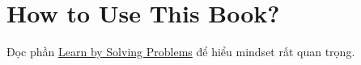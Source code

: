 \documentclass[a4paper]{report}
\begin{document}
\maketitle
\tableofcontents

\chapter{How to Use This Book?}

Đọc phần \href{https://artofproblemsolving.com/ebooks/prealgebra-ebook/par/154183}{Learn by Solving Problems} để hiểu mindset rất quan trọng.



\end{document}
